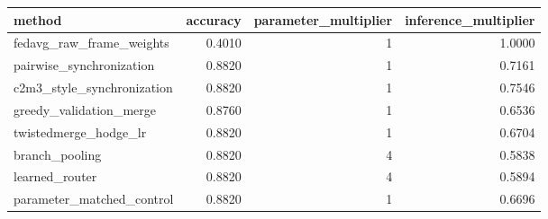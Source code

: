 \begin{tabular}{lrrr}
\toprule
method & accuracy & parameter_multiplier & inference_multiplier \\
\midrule
fedavg_raw_frame_weights & 0.4010 & 1 & 1.0000 \\
pairwise_synchronization & 0.8820 & 1 & 0.7161 \\
c2m3_style_synchronization & 0.8820 & 1 & 0.7546 \\
greedy_validation_merge & 0.8760 & 1 & 0.6536 \\
twistedmerge_hodge_lr & 0.8820 & 1 & 0.6704 \\
branch_pooling & 0.8820 & 4 & 0.5838 \\
learned_router & 0.8820 & 4 & 0.5894 \\
parameter_matched_control & 0.8820 & 1 & 0.6696 \\
\bottomrule
\end{tabular}
